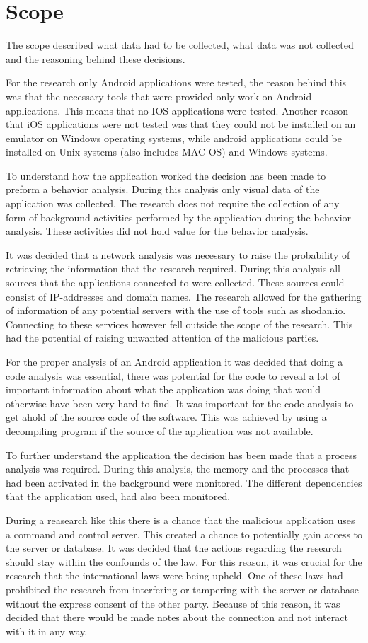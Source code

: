 \section{Scope}

The scope described what data had to be collected, what data was not collected and the reasoning behind these decisions.

For the research only Android applications were tested, the reason behind this was that the necessary tools that were provided only work on Android applications. 
This means that no IOS applications were tested. 
Another reason that iOS applications were not tested was that they could not be installed on an emulator on Windows operating systems, 
while android applications could be installed on Unix systems (also includes MAC OS) and Windows systems.

To understand how the application worked the decision has been made to preform a behavior analysis. 
During this analysis only visual data of the application was collected. 
The research does not require the collection of any form of background activities performed by the application during the behavior analysis. 
These activities did not hold value for the behavior analysis.

It was decided that a network analysis was necessary to raise the probability of retrieving the information that the research required. 
During this analysis all sources that the applications connected to were collected. These sources could consist of IP-addresses and domain names. 
The research allowed for the gathering of information of any potential servers with the use of tools such as shodan.io. 
Connecting to these services however fell outside the scope of the research. This had the potential of raising unwanted attention of the malicious parties.

For the proper analysis of an Android application it was decided that doing a code analysis was essential, 
there was potential for the code to reveal a lot of important information about what the application was doing that would otherwise have been very hard to find. 
It was important for the code analysis to get ahold of the source code of the software. 
This was achieved by using a decompiling program if the source of the application was not available.

To further understand the application the decision has been made that a process analysis was required. 
During this analysis, the memory and the processes that had been activated in the background were monitored. 
The different dependencies that the application used, had also been monitored.

During a reasearch like this there is a chance that the malicious application uses a command and control server. 
This created a chance to potentially gain access to the server or database. It was decided that the actions regarding the research should stay within the confounds of the law. 
For this reason, it was crucial for the research that the international laws were being upheld. 
One of these laws had prohibited the research from interfering or tampering with the server or database without the express consent of the other party. 
Because of this reason, it was decided that there would be made notes about the connection and not interact with it in any way.